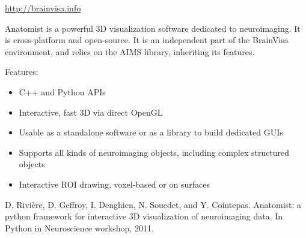 \documentclass[a4paper,english]{article}
\begin{document}
\url{http://brainvisa.info}
\begin{figure}
\noindent{}
\end{figure}

Anatomist is a powerful 3D visualization software dedicated to neuroimaging.
It is cross-platform and open-source. It is an independent part of the
BrainVisa environment, and relies on the AIMS library, inheriting its features.

Features:
%
\begin{itemize}

\item C++ and Python APIs

\item Interactive, fast 3D via direct OpenGL

\item Usable as a standalone software or as a library to build dedicated GUIs

\item Supports all kinds of neuroimaging objects, including complex structured
objects

\item Interactive ROI drawing, voxel-based or on surfaces

\end{itemize}

D. Rivière, D. Geffroy, I. Denghien, N. Souedet, and Y. Cointepas.
Anatomist: a python framework for interactive 3D visualization of neuroimaging
data. In Python in Neuroscience workshop, 2011.
\end{document}
